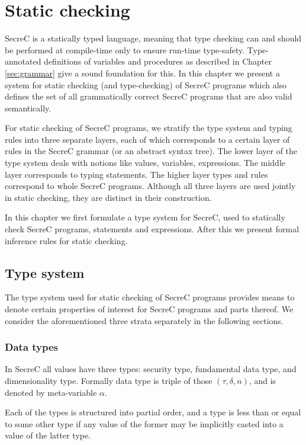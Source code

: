 \documentclass[a4paper, 10pt, draft]{report}
\begin{document}
\chapter{Static checking}\label{sec:checking}

SecreC is a statically typed language, meaning that type checking can and
should be performed at compile-time only to ensure run-time type-safety.
Type-annotated definitions of variables and procedures as described in Chapter
\ref{sec:grammar} give a sound foundation for this. In this chapter we present
a system for static checking (and type-checking) of SecreC programs which also
defines the set of all grammatically correct SecreC programs that are also
valid semantically.

For static checking of SecreC programs, we stratify the type system and typing
rules into three separate layers, each of which corresponds to a certain layer
of rules in the SecreC grammar (or an abstract syntax tree). The lower layer of
the type system deals with notions like values, variables, expressions. The
middle layer corresponds to typing statements. The higher layer types and rules
correspond to whole SecreC programs. Although all three layers are used jointly
in static checking, they are distinct in their construction.

In this chapter we first formulate a type system for SecreC, used to statically
check SecreC programs, statements and expressions. After this we present formal
inference rules for static checking.

\section{Type system}

The type system used for static checking of SecreC programs provides means to
denote certain properties of interest for SecreC programs and parts thereof. We
consider the aforementioned three strata separately in the following sections.

\subsection{Data types}

In SecreC all values have three types: security type, fundamental data type,
and dimensionality type. Formally data type is triple of those $(\tau, \delta,
n)$, and is denoted by meta-variable $\alpha$.

Each of the types is structured into partial order, and a type is less than or
equal to some other type if any value of the former may be implicitly casted
into a value of the latter type.
\end{document}
